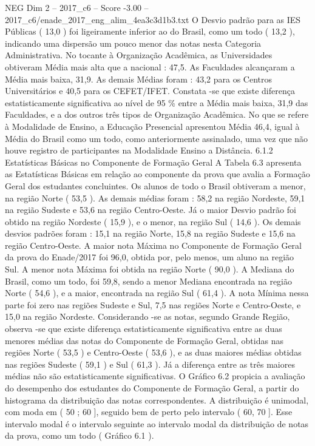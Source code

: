 \begin{textsample}{NEG Dim 2 – 2017\_c6 – Score -3.00 – 2017\_c6/enade\_2017\_eng\_alim\_4ea3c3d1b3.txt}
O Desvio padrão para as IES Públicas ( 13,0 ) foi ligeiramente inferior ao do Brasil, como um todo ( 13,2 ), indicando uma dispersão um pouco menor das notas nesta Categoria Administrativa.
No tocante à Organização Acadêmica, as Universidades obtiveram Média mais alta que a nacional : 47,5.
As Faculdades alcançaram a Média mais baixa, 31,9.
As demais Médias foram : 43,2 para os Centros Universitários e 40,5 para os CEFET/IFET.
Constata -se que existe diferença estatisticamente significativa ao nível de 95 \% entre a Média mais baixa, 31,9 das Faculdades, e a dos outros três tipos de Organização Acadêmica.
No que se refere à Modalidade de Ensino, a Educação Presencial apresentou Média 46,4, igual à Média do Brasil como um todo, como anteriormente assinalado, uma vez que não houve registro de participantes na Modalidade Ensino a Distância. 6.1.2 Estatísticas Básicas no Componente de Formação Geral A Tabela 6.3 apresenta as Estatísticas Básicas em relação ao componente da prova que avalia a Formação Geral dos estudantes concluintes.
Os alunos de todo o Brasil obtiveram a menor, na região Norte ( 53,5 ).
As demais médias foram : 58,2 na região Nordeste, 59,1 na região Sudeste e 53,6 na região Centro-Oeste.
Já o maior Desvio padrão foi obtido na região Nordeste ( 15,9 ), e o menor, na região Sul ( 14,6 ).
Os demais desvios padrões foram : 15,1 na região Norte, 15,8 na região Sudeste e 15,6 na região Centro-Oeste.
A maior nota Máxima no Componente de Formação Geral da prova do Enade/2017 foi 96,0, obtida por, pelo menos, um aluno na região Sul.
A menor nota Máxima foi obtida na região Norte ( 90,0 ).
A Mediana do Brasil, como um todo, foi 59,8, sendo a menor Mediana encontrada na região Norte ( 54,6 ), e a maior, encontrada na região Sul ( 61,4 ).
A nota Mínima nessa parte foi zero nas regiões Sudeste e Sul, 7,5 nas regiões Norte e Centro-Oeste, e 15,0 na região Nordeste.
Considerando -se as notas, segundo Grande Região, observa -se que existe diferença estatisticamente significativa entre as duas menores médias das notas do Componente de Formação Geral, obtidas nas regiões Norte ( 53,5 ) e Centro-Oeste ( 53,6 ), e as duas maiores médias obtidas nas regiões Sudeste ( 59,1 ) e Sul ( 61,3 ).
Já a diferença entre as três maiores médias não são estatisticamente significativas.
O Gráfico 6.2 propicia a avaliação do desempenho dos estudantes do Componente de Formação Geral, a partir do histograma da distribuição das notas correspondentes.
A distribuição é unimodal, com moda em ( 50 ; 60 ], seguido bem de perto pelo intervalo ( 60, 70 ].
Esse intervalo modal é o intervalo seguinte ao intervalo modal da distribuição de notas da prova, como um todo ( Gráfico 6.1 ).

\end{textsample}
